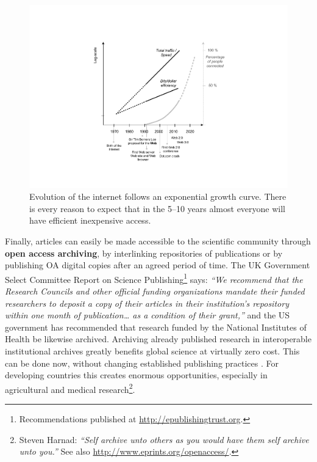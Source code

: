 \documentclass[graybox,envcountchap,sectrefs,UStrade]{svmono}
\begin{document}
\begin{figure}[!htb]
\begin{center}
  \includegraphics[width=.8\textwidth]{Fig_internet_plots.pdf}
\caption{Evolution of the internet follows an exponential growth curve. There is every reason to expect that in the 5--10 years almost everyone will have efficient inexpensive access.} \label{Fig:internet_plots}
\end{center}
\end{figure}

Finally, articles can easily be made accessible to the scientific community through \textbf{open access archiving}\label{sec:OAA}, by interlinking repositories of publications or by publishing OA digital copies after an agreed period of time. The UK Government Select Committee Report on Science Publishing\footnote{Recommendations published at \url{http://epublishingtrust.org}.} says: \emph{``We recommend that the Research Councils and other official funding organizations mandate their funded researchers to deposit a copy of their articles in their institution's repository within one month of publication{\ldots} as a condition of their grant,''} and the US government has recommended that research funded by the National Institutes of Health be likewise archived. Archiving already published research in interoperable institutional archives greatly benefits global science at virtually zero cost. This can be done now, without changing established publishing practices \citep{ICU2006}. For developing countries this creates enormous opportunities, especially in agricultural and medical research\footnote{Steven Harnad: \emph{``Self archive unto others as you would have them self archive unto you.''} See also \url{http://www.eprints.org/openaccess/}.}. \par
\end{document}
